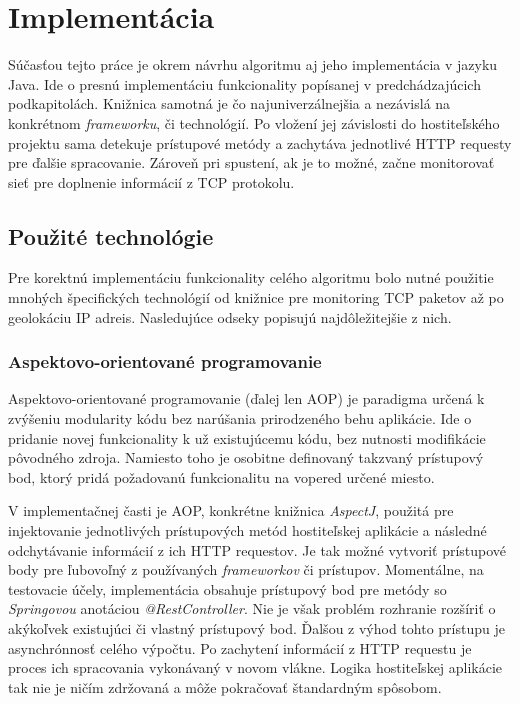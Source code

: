 \documentclass[
  digital, %
  table,   %
  lof,     %
  nolot,   %
  nocover
]{fithesis3}
\begin{document}
\section{Implementácia}
Súčasťou tejto práce je okrem návrhu algoritmu aj jeho implementácia v jazyku
Java. Ide o presnú implementáciu funkcionality popísanej v predchádzajúcich
podkapitolách. Knižnica samotná je čo najuniverzálnejšia a nezávislá na
konkrétnom \textit{frameworku}, či technológií. Po vložení jej závislosti do
hostiteľského projektu sama detekuje prístupové metódy a zachytáva jednotlivé
HTTP requesty pre ďalšie spracovanie. Zároveň pri spustení, ak je to možné,
začne monitorovať sieť pre doplnenie informácií z TCP protokolu.

\subsection{Použité technológie}
Pre korektnú implementáciu funkcionality celého algoritmu bolo nutné použitie
mnohých špecifických technológií od knižnice pre monitoring TCP paketov až po
geolokáciu IP adreis. Nasledujúce odseky popisujú najdôležitejšie z nich.

\subsubsection{Aspektovo-orientované programovanie}
Aspektovo-orientované programovanie (ďalej len AOP) je paradigma určená k
zvýšeniu modularity kódu bez narúšania prirodzeného behu aplikácie. Ide o 
pridanie novej funkcionality k už existujúcemu kódu, bez nutnosti modifikácie
pôvodného zdroja. Namiesto toho je osobitne definovaný takzvaný prístupový bod,
ktorý pridá požadovanú funkcionalitu na vopered určené miesto.

V implementačnej časti je AOP, konkrétne knižnica \textit{AspectJ}, použitá pre
injektovanie jednotlivých prístupových metód hostiteľskej aplikácie a následné
odchytávanie informácií z ich HTTP requestov. Je tak možné vytvoriť prístupové
body pre ľubovoľný z používaných \textit{frameworkov} či prístupov. Momentálne, na
testovacie účely, implementácia obsahuje prístupový bod pre metódy so
\textit{Springovou} anotáciou \textit{@RestController}. Nie je však problém
rozhranie rozšíriť o akýkoľvek existujúci či vlastný prístupový bod. Ďalšou z 
výhod tohto prístupu je asynchrónnosť celého výpočtu. Po zachytení informácií
z HTTP requestu je proces ich spracovania vykonávaný v novom vlákne. Logika
hostiteľskej aplikácie tak nie je ničím zdržovaná a môže pokračovať štandardným
spôsobom.
\end{document}
